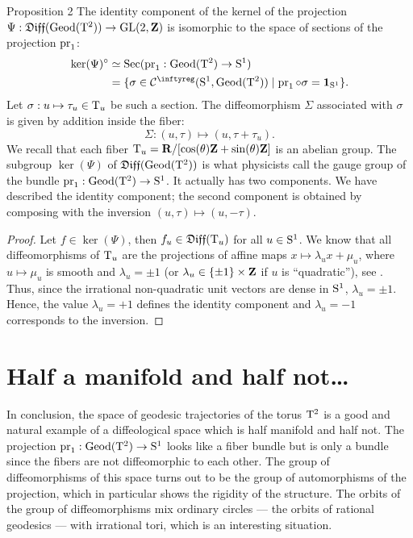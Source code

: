 \begin{Article}{Proposition 2}{}
  The identity component of the kernel of the projection $\Psi : \mathfrak{Diff}(\operatorname{Geod}(\mathrm{T}^2)) \to \mathrm{GL}(2,\mathbf{Z})$ is isomorphic to the space of sections of the projection $\operatorname{pr}_1$:
  \begin{align*}
    \ker(\Psi)^\circ & \simeq  \Sections(\Proj_1 : \Geod(\Torus^2) \to \Sph^1) \\
    & = \{ \sigma \in \Cinfty(\Sph^1, \Geod(\Torus^2)) \mid \Proj_1 \circ \sigma = \Id_{\Sph^1} \}.
  \end{align*}
  Let $\sigma : u \mapsto \tau_u \in \mathrm{T}_u$ be such a section.
  The diffeomorphism $\Sigma$ associated with $\sigma$ is given by addition inside the fiber:
  $$%
    \Sigma : (u, \tau) \mapsto (u, \tau + \tau_u).
    $$%
  We recall that each fiber $\mathrm{T}_u = \mathbf{R}/[\cos(\theta) \mathbf{Z} + \sin(\theta) \mathbf{Z}]$ is an abelian group.
  The subgroup $\ker(\Psi)$ of $\mathfrak{Diff}(\operatorname{Geod}(\mathrm{T}^2))$ is what physicists call the gauge group of the bundle $\operatorname{pr}_1 : \operatorname{Geod}(\mathrm{T}^2) \to \mathrm{S}^1$.
  It actually has two components.
  We have described the identity component;
  the second component is obtained by composing with the inversion $(u,\tau) \mapsto (u,-\tau)$.
\end{Article}

\begin{proof}
  Let $f \in \ker(\Psi)$,
  then $f_u \in \mathfrak{Diff}(\mathrm{T}_u)$ for all $u \in \mathrm{S}^1$.
  We know that all diffeomorphisms of $\mathrm{T}_u$ are the projections of affine maps $x \mapsto \lambda_u x + \mu_u$,
  where $u \mapsto \mu_u$ is smooth and $\lambda_u = \pm 1$ (or $\lambda_u \in \{\pm 1\} \times \mathbf{Z}$ if $u$ is ``quadratic''),
  see \cite{DI83}.
  Thus,
  since the irrational non-quadratic unit vectors are dense in $\mathrm{S}^1$,
  $\lambda_u = \pm 1$.
  Hence,
  the value $\lambda_u = +1$ defines the identity component and $\lambda_u = -1$ corresponds to the inversion.
\end{proof}

\section{Half a manifold and half not\dots}

In conclusion,
the space of geodesic trajectories of the torus $\mathrm{T}^2$ is a good and natural example of a diffeological space which is half manifold and half not.
The projection $\operatorname{pr}_1 : \operatorname{Geod}(\mathrm{T}^2) \to \mathrm{S}^1$ looks like a fiber bundle but is only a bundle since the fibers are not diffeomorphic to each other.
The group of diffeomorphisms of this space turns out to be the group of automorphisms of the projection,
which in particular shows the rigidity of the structure.
The orbits of the group of diffeomorphisms mix ordinary circles
--- the orbits of rational geodesics ---
with irrational tori,
which is an interesting situation.


